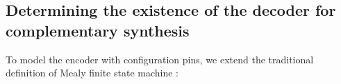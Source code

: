 \documentclass[journal]{IEEEtran}
\begin{document}
%


%
%
%





\subsection{Determining the existence of the decoder for complementary synthesis}\label{subsec_chkextdec}
To model the encoder with configuration pins,
we extend the traditional definition of Mealy finite state machine \cite{MEALY}:
\end{document}
